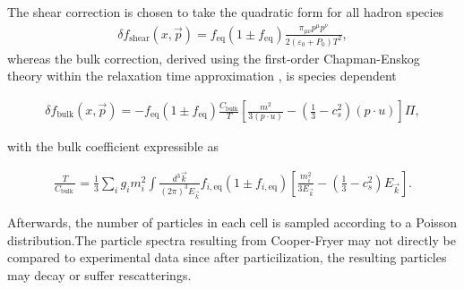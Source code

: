 The shear correction is chosen to take the quadratic form \cite{dusling} for all hadron species
\begin{align*}
    \delta f_{\text {shear}}(x, \vec{p})=f_\text{eq}\left(1\pm f_\text{eq}\right) \frac{\pi_{\mu \nu} p^{\mu} p^{\nu}}{2\left(\varepsilon_{0}+P_{0}\right) T^{2}},
\end{align*}
whereas the bulk correction, derived using the first-order Chapman-Enskog theory within the relaxation time approximation \cite{paquetbulk, bozek}, is species dependent
\begin{fullwidth}
\begin{align*}
    \delta f_{\text {bulk}}(x, \vec{p})=-f_\text{eq}\left(1\pm f_\text{eq}\right) \frac{C_{\text {bulk}}}{T}\left[\frac{m^{2}}{3(p \cdot u)}-\left(\frac{1}{3}-c_{s}^{2}\right)(p \cdot u)\right] \Pi,
\end{align*}
\end{fullwidth}
with the bulk coefficient expressible as
\begin{fullwidth}
\begin{align*}
    \frac{T}{C_{\text {bulk }}}=\frac{1}{3} \sum_{i} g_{i} m_{i}^{2} \int \frac{d^{3} \vec{k}}{(2 \pi)^{3} E_{\vec{k}}} f_{i, \text{eq}}\left(1 \pm f_{i, \text{eq}}\right)\left[\frac{m_{i}^{2}}{3 E_{\vec{k}}}-\left(\frac{1}{3}-c_{s}^{2}\right) E_{\vec{k}}\right].
\end{align*}
\end{fullwidth}
Afterwards, the number of particles in each cell is sampled according to a Poisson distribution.The particle spectra resulting from Cooper-Fryer may not directly be compared to experimental data since after particilization, the resulting particles may decay or suffer rescatterings. 

